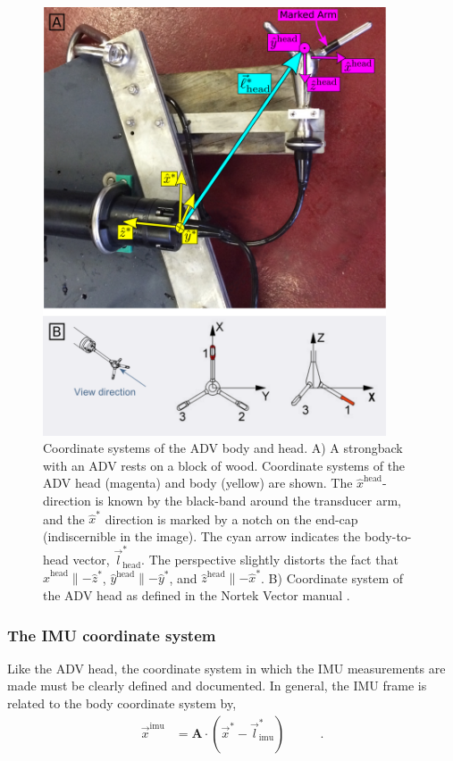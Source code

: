 \documentclass[twocol]{ametsoc}
\def\bhv{\ensuremath{\vec{l}_\mathrm{head}^*}}
\def\ihv{\ensuremath{\vec{l}^*_\mathrm{imu}}}
\begin{document}
\begin{figure}
  \centering
    \includegraphics[width=4in]{ADV_coord_sys4}
  \caption{Coordinate systems of the ADV body and head. A) A strongback with an ADV rests on a block of wood. Coordinate systems of the ADV head (magenta) and body (yellow) are shown. The $\hat{x}^\mathrm{head}$-direction is known by the black-band around the transducer arm, and the $\hat{x}^*$ direction is marked by a notch on the end-cap (indiscernible in the image). The cyan arrow indicates the body-to-head vector, $\bhv$.  The perspective slightly distorts the fact that  $\hat{x}^\mathrm{head} \parallel -\hat{z}^* $, $\hat{y}^\mathrm{head} \parallel -\hat{y}^* $, and $\hat{z}^\mathrm{head} \parallel -\hat{x}^* $.  B) Coordinate system of the ADV head as defined in the Nortek Vector manual \cite[]{vector_manual2005}. }
  \label{fig:adv-coord-sys}
\end{figure}

\subsubsection{The IMU coordinate system}\label{apdx:coord-sys:imu}

Like the ADV head, the coordinate system in which the IMU measurements are made must be clearly defined and documented. In general, the IMU frame is related to the body coordinate system by,
\begin{align*}
  \vec{x}^\mathrm{imu} &= \mathbf{A}  \cdot (\vec{x}^* - \ihv) & \qquad .
\end{align*}
\end{document}
